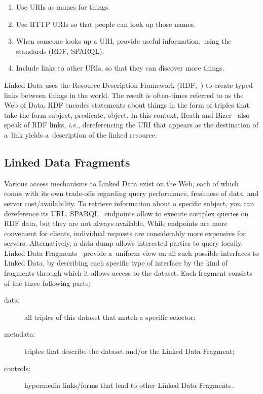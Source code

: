 \documentclass[runningheads,a4paper]{llncs}
\begin{document}
\begin{enumerate}
	\item Use URIs as names for things.
	\item Use HTTP URIs so that people can look up those names.
	\item When someone looks up a URI, provide useful information, using the standards (RDF, SPARQL).
	\item Include links to other URIs, so that they can discover more things.
\end{enumerate}

Linked Data uses the Resource Description Framework (RDF,~\cite{klyne2004rdf})
to create typed links between things in the world.
The result is often-times referred to as the Web of Data.
RDF encodes statements about things in the form of triples that take the form subject, predicate, object. 
In this context, Heath and Bizer~\cite{bizer2009linkeddatastory} also speak of RDF links,
\emph{i.e.}, dereferencing the URI that appears as the destination of a~link
yields a~description of the linked resource.

\subsection{Linked Data Fragments}
Various access mechanisms to Linked Data exist on the Web,
each of which comes with its own trade-offs regarding query performance, freshness of data,
and server cost/availability.
To retrieve information about a specific subject, you can dereference its URL.
SPARQL~\cite{prudhommeaux2008sparql} endpoints allow to execute complex queries on RDF data,
but they are not always available.
While endpoints are more convenient for clients, individual requests
are considerably more expensive for servers.
Alternatively, a data dump allows interested parties to query locally.
Linked Data Fragments~\cite{verborgh2014ldf} provide a~uniform view
on all such possible interfaces to Linked Data,
by describing each specific type of interface by the kind of fragments through which
it allows access to the dataset.
Each fragment consists of the three following parts:

\begin{description}
	\item[data:] all triples of this dataset that match a specific selector;
	\item[metadata:] triples that describe the dataset and/or the Linked Data Fragment;
	\item[controls:] hypermedia links/forms that lead to other Linked Data Fragments.
\end{description}
\end{document}
